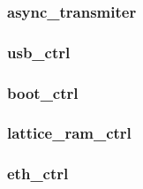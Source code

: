 \documentclass{article}
\begin{document}
\begin{spacing}{1.4}
\subsubsection{async\_transmiter}
\subsubsection{usb\_ctrl}
\subsubsection{boot\_ctrl}
\subsubsection{lattice\_ram\_ctrl}
\subsubsection{eth\_ctrl}


\end{spacing}
\end{document}
